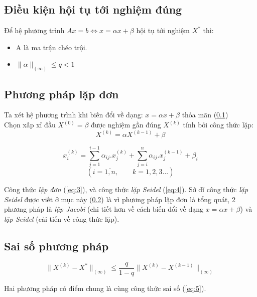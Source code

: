 \documentclass[twoside]{report2}
\begin{document}
\subsection{Điều kiện hội tụ tới nghiệm đúng}
\label{sub:132}

Để hệ phương trình $Ax = b \Leftrightarrow x = \alpha x + \beta$ hội tụ tới nghiệm $X^*$ thì:

\begin{itemize}
\item A là ma trận chéo trội.
\item $\big\| \alpha \big\|_{(\infty)} \leq q < 1$
\end{itemize}

\subsection{Phương pháp lặp đơn}
\label{sub:pp}
Ta xét hệ phương trình khi biến đổi về dạng: $x=\alpha x + \beta$ thỏa mãn (\ref{sub:132})\\

Chọn xấp xỉ đầu $X^{(0)} = \beta$ được nghiệm gần đúng $X^{(k)}$ tính bởi công thức lặp:
\begin{equation} \label{eq:3}
X^{(k)} = \alpha X^{(k-1)} + \beta
\end{equation}

\begin{equation} \label{eq:4}
x_i^{(k)} = \sum_{j=1}^{i-1} \alpha_{ij} . x_j^{(k)} + \sum_{j=i}^n \alpha_{ij}.x_j^{(k-1)} + \beta_i
\end{equation}
\[(i= \overline{1,n},\qquad k= 1,2,3...)\]

Công thức \emph{lặp đơn} (\ref{eq:3}), và công thức \emph{lặp Seidel} (\ref{eq:4}). Sở dĩ công thức \emph{lặp Seidel} được viết ở mục này (\ref{sub:pp}) là vì phương pháp lặp đơn là tổng quát, 2 phương pháp  là \emph{lặp Jacobi} (chi tiết hơn về cách biến đổi về dạng $x =\alpha x + \beta$) và \emph{lặp Seidel} (cải tiến về công thức lặp).

\subsection{Sai số phương pháp}
\begin{equation} \label{eq:5}
\Big\|X^{(k)} - X^*\Big\|_{(\infty)} \le \frac{q}{1-q} \Big\| X^{(k)} - X^{(k-1)}\Big\|_{(\infty)}
\end{equation}

Hai phương pháp có điểm chung là cùng công thức sai số (\ref{eq:5}).
\end{document}
